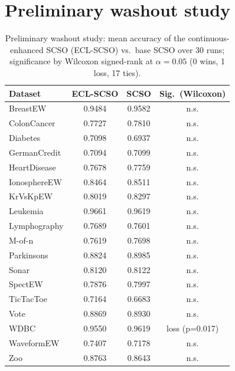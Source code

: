 \documentclass[9pt]{article}
\begin{document}
\section{Preliminary washout study}
\begin{table}[t]
\centering
\caption{Preliminary washout study: mean accuracy of the continuous-enhanced SCSO (ECL-SCSO) vs.\ base SCSO over 30 runs; significance by Wilcoxon signed-rank at $\alpha=0.05$ (0 wins, 1 loss, 17 ties).}
\label{tab:washout}
\footnotesize
\begin{tabular}{lccc}
\toprule
Dataset & ECL-SCSO & SCSO & Sig.\ (Wilcoxon) \\
\midrule
BreastEW & 0.9484 & 0.9582 & n.s. \\
ColonCancer & 0.7727 & 0.7810 & n.s. \\
Diabetes & 0.7098 & 0.6937 & n.s. \\
GermanCredit & 0.7094 & 0.7099 & n.s. \\
HeartDisease & 0.7678 & 0.7759 & n.s. \\
IonosphereEW & 0.8464 & 0.8511 & n.s. \\
KrVsKpEW & 0.8019 & 0.8297 & n.s. \\
Leukemia & 0.9661 & 0.9619 & n.s. \\
Lymphography & 0.7689 & 0.7601 & n.s. \\
M-of-n & 0.7619 & 0.7698 & n.s. \\
Parkinsons & 0.8824 & 0.8985 & n.s. \\
Sonar & 0.8120 & 0.8122 & n.s. \\
SpectEW & 0.7876 & 0.7997 & n.s. \\
TicTacToe & 0.7164 & 0.6683 & n.s. \\
Vote & 0.8869 & 0.8930 & n.s. \\
WDBC & 0.9550 & 0.9619 & loss (p=0.017) \\
WaveformEW & 0.7407 & 0.7178 & n.s. \\
Zoo & 0.8763 & 0.8643 & n.s. \\
\bottomrule
\end{tabular}
\end{table}


\FloatBarrier
\end{document}

